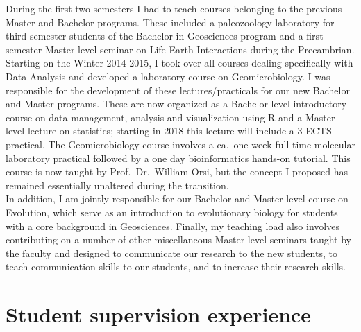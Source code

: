 \documentclass[a4paper,11pt]{article}
\begin{document}
During the first two semesters I had to teach courses belonging to the previous Master and Bachelor programs. These included a paleozoology laboratory for third semester students of the Bachelor in Geosciences program and a first semester Master-level seminar on Life-Earth Interactions during the Precambrian.\\

Starting on the Winter 2014-2015, I took over all courses dealing specifically with Data Analysis and developed a laboratory course on Geomicrobiology. I was responsible for the development of these lectures/practicals for our new Bachelor and Master programs. These are now organized as a Bachelor level introductory course on data management, analysis and visualization using R and a Master level lecture on statistics; starting in 2018 this lecture will include a 3 ECTS practical. The Geomicrobiology course involves a ca.~one week full-time molecular laboratory practical followed by a one day bioinformatics hands-on tutorial. This course is now taught by Prof.~Dr.~William Orsi, but the concept I proposed has remained essentially unaltered during the transition.\\

In addition, I am jointly responsible for our Bachelor and Master level course on Evolution, which serve as an introduction to evolutionary biology for students with a core background in Geosciences. Finally, my teaching load also involves contributing on a number of other miscellaneous Master level seminars taught by the faculty and designed to communicate our research to the new students, to teach communication skills to our students, and to increase their research skills.

\section*{Student supervision experience}
\end{document}
